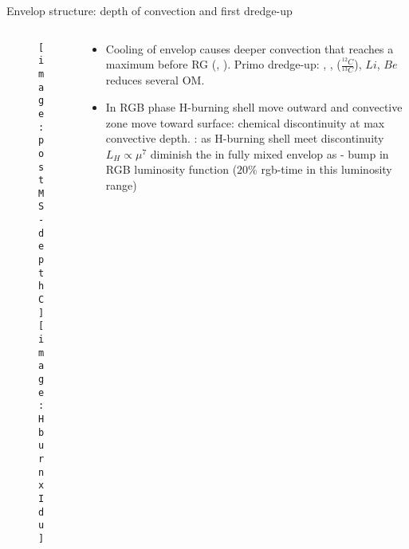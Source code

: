 \begin{frame}{Envelop structure: depth of convection and first dredge-up}
\begin{columns}[T]\begin{column}{0.44\textwidth}
\begin{figure}[!ht]
\texttt{[image: postMS-depthC]}\label{fig:postMS-depthC}
\texttt{[image: HburnxIdu]}\label{fig:HburnxIdu}
\end{figure}
\end{column}
\begin{column}{0.50\textwidth}
\begin{itemize}
\item Cooling of envelop causes deeper convection that reaches a maximum before RG (, \xaumenta{\kappa}). Primo dredge-up: , ,  ($\frac{^{12}C}{^{13}C}$), $Li$, $Be$ reduces several OM.
\item In RGB phase H-burning shell move outward and convective zone move toward surface: chemical discontinuity at max convective depth. : as H-burning shell meet discontinuity $L_H\propto\mu^7$ diminish the in fully mixed envelop  as  - bump in RGB luminosity function ($20\%$ rgb-time in this luminosity range)
\end{itemize}
\end{column}\end{columns}
\end{frame}

